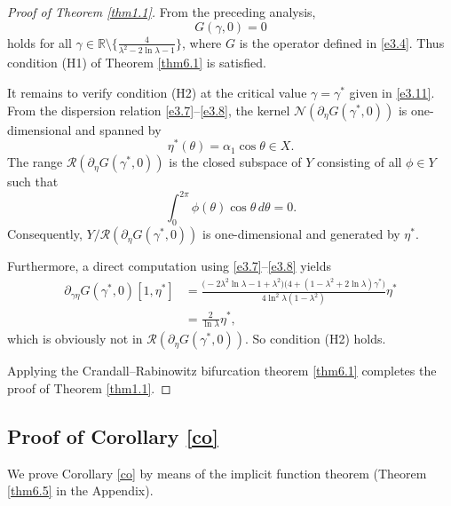 \documentclass[reqno]{amsart}
\numberwithin{equation}{section}
\numberwithin{equation}{section}
\numberwithin{equation}{section}
\begin{document}
\begin{proof}[Proof of Theorem \ref{thm1.1}]
From the preceding analysis,
$$
G(\gamma,0)=0
$$
holds for all \(\gamma \in \mathbb{R} \setminus \bigl\{ \frac{4}{\lambda^2 - 2\ln\lambda - 1} \bigr\}\), where \(G\) is the operator defined in \eqref{e3.4}. Thus condition (H1) of Theorem \ref{thm6.1} is satisfied.

It remains to verify condition (H2) at the critical value \(\gamma = \gamma^*\) given in \eqref{e3.11}. From the dispersion relation \eqref{e3.7}--\eqref{e3.8}, the kernel \(\mathcal{N}(\partial_\eta G(\gamma^*,0))\) is one-dimensional and spanned by
\[
\eta^*(\theta) = \alpha_1 \cos\theta \in X.
\]
The range \(\mathcal{R}(\partial_\eta G(\gamma^*,0))\) is the closed subspace of \(Y\) consisting of all \(\phi \in Y\) such that
\[
\int_0^{2\pi} \phi(\theta)\cos\theta \, d\theta = 0.
\]
Consequently, \(Y / \mathcal{R}(\partial_\eta G(\gamma^*,0))\) is one-dimensional and generated by \(\eta^*\).

Furthermore, a direct computation using \eqref{e3.7}--\eqref{e3.8} yields
\begin{equation}
\begin{aligned}
\partial_{\gamma\eta} G(\gamma^*,0)[1,\eta^*] &= \frac{\bigl(-2\lambda^2 \ln\lambda - 1 + \lambda^2\bigr) \bigl(4 + (1 - \lambda^2 + 2\ln\lambda)\gamma^*\bigr)}{4\ln^2\lambda (1 - \lambda^2)} \eta^* \\
&=\frac{2}{\ln\lambda}\eta^*, \nonumber
\end{aligned}
\end{equation}
which is obviously not in $\mathcal{R}(\partial_\eta G(\gamma^*,0)).$
So condition (H2) holds.

Applying the Crandall--Rabinowitz bifurcation theorem \ref{thm6.1} completes the proof of Theorem \ref{thm1.1}.
\end{proof}

\subsection{Proof of Corollary \ref{co}}

We prove Corollary \ref{co} by means of the implicit function theorem (Theorem \ref{thm6.5} in the Appendix).
\end{document}
